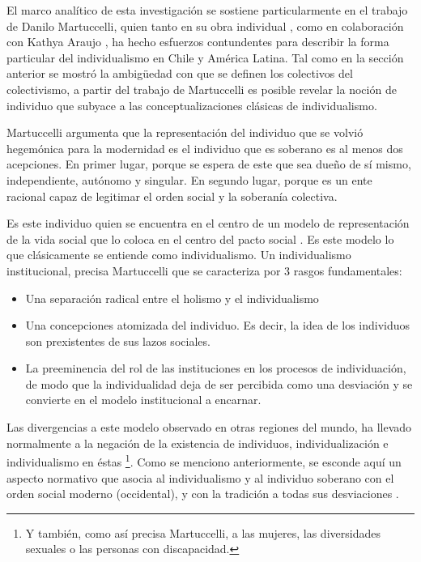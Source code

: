 \documentclass[12pt,twoside]{templates/facsothesis}
\providecommand{\tightlist}{%
  \setlength{\itemsep}{0pt}\setlength{\parskip}{0pt}}
\begin{document}
El marco analítico de esta investigación se sostiene particularmente en el trabajo de Danilo Martuccelli, quien tanto en su obra individual \citetext{\citeyear{martuccelli2010}; \citeyear{martuccelli2018}}, como en colaboración con Kathya Araujo \citetext{\citeyear{araujo2014}; \citeyear{araujo2020}; \citeyear{araujo2012}}, ha hecho esfuerzos contundentes para describir la forma particular del individualismo en Chile y América Latina. Tal como en la sección anterior se mostró la ambigüedad con que se definen los colectivos del colectivismo, a partir del trabajo de Martuccelli es posible revelar la noción de individuo que subyace a las conceptualizaciones clásicas de individualismo.

Martuccelli \citeyearpar{martuccelli2010} argumenta que la representación del individuo que se volvió hegemónica para la modernidad es el individuo que es soberano es al menos dos acepciones. En primer lugar, porque se espera de este que sea dueño de sí mismo, independiente, autónomo y singular. En segundo lugar, porque es un ente racional capaz de legitimar el orden social y la soberanía colectiva.

Es este individuo quien se encuentra en el centro de un modelo de representación de la vida social que lo coloca en el centro del pacto social \citep{martuccelli2010, martuccelli2018}. Es este modelo lo que clásicamente se entiende como individualismo. Un individualismo institucional, precisa Martuccelli \citeyearpar{martuccelli2018} que se caracteriza por 3 rasgos fundamentales:

\begin{itemize}
\tightlist
\item
  Una separación radical entre el holismo y el individualismo
\item
  Una concepciones atomizada del individuo. Es decir, la idea de los individuos son prexistentes de sus lazos sociales.
\item
  La preeminencia del rol de las instituciones en los procesos de individuación, de modo que la individualidad deja de ser percibida como una desviación y se convierte en el modelo institucional a encarnar.
\end{itemize}

Las divergencias a este modelo observado en otras regiones del mundo, ha llevado normalmente a la negación de la existencia de individuos, individualización e individualismo en éstas \footnote{Y también, como así precisa Martuccelli, a las mujeres, las diversidades sexuales o las personas con discapacidad.}. Como se menciono anteriormente, se esconde aquí un aspecto normativo que asocia al individualismo y al individuo soberano con el orden social moderno (occidental), y con la tradición a todas sus desviaciones \citep{martuccelli2018}.
\end{document}
